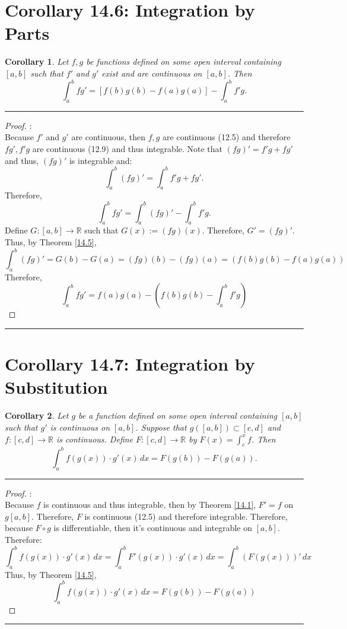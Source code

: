 \documentclass[openany, amssymb, psamsfonts]{amsart}
\newcommand{\bbR}{\mathbb{R}}
\newtheorem{cor}{Corollary}[section]
\theoremstyle{definition}
\numberwithin{equation}{section}
\begin{document}
\section*{Corollary 14.6: Integration by Parts}
\begin{cor} 

	Let $f, g$ be functions defined on some open interval containing $[a, b]$ such that $f'$ and $g'$ exist and are continuous on $[a, b]$. Then
	\[
		\int_a^b fg' = [f(b)g(b) - f(a)g(a)] - \int_a^b f' g.
	\]
\end{cor} 
\vspace{4pt}     \hrule   \vspace{4pt} \begin{proof}:\\
Because $f'$ and $g'$ are continuous, then $f,g$ are continuous (12.5) and therefore $fg', f'g$ are continuous (12.9) and thus integrable. 
\newline Note that $(fg)' = f'g + fg'$ and thus, $(fg)'$ is integrable and: \[\int_a^b (fg)' = \int_a^b f'g + fg'.\] Therefore, \[\int_a^bfg' = \int_a^b (fg)' - \int_a^b f'g.\] 
Define $G: [a,b] \to \bbR$ such  that $G(x) := (fg)(x).$ Therefore, $G' = (fg)'.$ Thus, by Theorem \ref{14.5}, \[\int_a^b (fg)' = G(b) - G(a) = (fg)(b) - (fg)(a)  = (f(b)g(b) - f(a)g(a))\]
Therefore, 
\[\int_a^bfg' = f(a)g(a) - (f(b)g(b) - \int_a^b f'g)\]
\end{proof}      \vspace{4pt}     \hrule   \vspace{4pt} 

\section*{Corollary 14.7: Integration by Substitution}
\begin{cor} 
\label{14.7}
	Let $g$ be a function defined on some open interval containing $[a, b]$ such that $g'$ is continuous on $[a, b]$. Suppose that $g([a, b]) \subset [c, d]$ and $f\colon [c, d] \to \bbR$ is continuous. Define $F\colon [c, d] \to \bbR$ by $F(x) = \int_c^x f$.
	Then
	\[
		\int_a^b f(g(x)) \cdot g'(x) \, dx = F(g(b)) - F(g(a)).
	\]
\end{cor}
\vspace{4pt}     \hrule   \vspace{4pt} \begin{proof}:\\
    Because $f$ is continuous and thus integrable, then by Theorem \ref{14.1}, $F' = f$ on $g[a,b].$  Therefore, $F$ is continuous (12.5) and therefore integrable. Therefore, because $F\circ g$ is differentiable, then it's continuous and integrable on $[a,b].$ Therefore: \[\int_a^b f(g(x)) \cdot g'(x) \, dx = \int_a^b F'(g(x)) \cdot g'(x) \, dx = \int_a^b (F(g(x)))' \, dx\]  
    Thus, by Theorem \ref{14.5}, \[\int_a^b f(g(x))\cdot g'(x) \, dx =  F(g(b)) - F(g(a))\]
\end{proof}\vspace{4pt}     \hrule   \vspace{4pt} 
\end{document}
